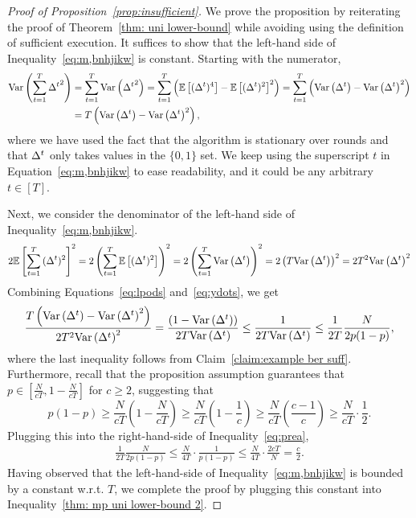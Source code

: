 \begin{proof}[Proof of Proposition~\ref{prop:insufficient}]
We prove the proposition by reiterating the proof of Theorem~\ref{thm: uni lower-bound} while avoiding using the definition of sufficient execution. It suffices to show that the left-hand side of Inequality~\eqref{eq:m,bnhjikw} is constant. Starting with the numerator,
\begin{align}\label{eq:lpods}
\mathrm{Var}\left(  \sum^T_{t=1}{ {\Delta^t}^2}  \right) &= \sum^T_{t=1} \mathrm{Var}\left(  {\Delta^t}^2 \right) =  \sum^T_{t=1} \left(\mathbb{E}\left[ ({\Delta^t})^4 \right]-\mathbb{E}\left[ ({\Delta^t})^2 \right]^2 \right) = \sum^T_{t=1} \left( \mathrm{Var}\left( {\Delta^t} \right) - \mathrm{Var}\left( {\Delta^t} \right)^2 \right) \nonumber \\
&= T\left( \mathrm{Var}\left( {\Delta^t} \right) - \mathrm{Var}\left( {\Delta^t} \right)^2 \right),
\end{align}
where we have used the fact that the algorithm is stationary over rounds and that ${\Delta^t}$ only takes values in the $\{0,1\}$ set. We keep using the superscript $t$ in Equation~\eqref{eq:m,bnhjikw} to ease readability, and it could be any arbitrary $t \in [T]$.

Next, we consider the denominator of the left-hand side of Inequality~\eqref{eq:m,bnhjikw}.
\begin{align}\label{eq:ydots}
2 \mathbb{E}\left[  \sum^T_{t=1}{({\Delta^t})^2}  \right]^2 =2  \left(\sum^T_{t=1}{\mathbb{E}\left[ ({\Delta^t})^2 \right] }\right)^2 = 2  \left(\sum^T_{t=1}{\mathrm{Var}\left( {\Delta^t} \right) }\right)^2 =  2 \left(T{\mathrm{Var}\left( {\Delta^t} \right) }\right)^2 = 2T^2 \mathrm{Var}\left( {\Delta^t} \right)^2
\end{align}
Combining Equations~\eqref{eq:lpods} and~\eqref{eq:ydots}, we get
\begin{align}\label{eq:prea}
\frac{T\left( \mathrm{Var}\left( {\Delta^t} \right) - \mathrm{Var}\left( {\Delta^t} \right)^2 \right)}{2T^2 \mathrm{Var}\left( {\Delta^t} \right)^2}=\frac{\left( 1 - \mathrm{Var}\left( {\Delta^t} \right) \right)}{2T \mathrm{Var}\left( {\Delta^t} \right)} \leq 
\frac{1}{2T \mathrm{Var}\left( {\Delta^t} \right)} \leq \frac{1}{2T}\frac{N}{2p(1-p)},
\end{align}
where the last inequality follows from Claim~\ref{claim:example ber suff}. 
Furthermore, recall that the proposition assumption guarantees that $p\in \left[\frac{N}{cT}, 1-\frac{N}{cT}\right]$ for $c\geq 2$, suggesting that
\[
p (1-p)\geq \frac{N}{cT}\left(1- \frac{N}{cT}\right) \geq \frac{N}{cT}\left(1- \frac{1}{c}\right) \geq \frac{N}{cT}\left(\frac{c-1}{c}\right) \geq \frac{N}{cT}\cdot \frac{1}{2}.
\]
Plugging this into the right-hand-side of Inequality~\eqref{eq:prea},
\begin{align}
 \frac{1}{2T}\frac{N}{2p(1-p)} \leq \frac{N}{4T} \cdot \frac{1}{p(1-p)} \leq \frac{N}{4T} \cdot \frac{2c T}{N}  = \frac{c}{2}.
\end{align}
Having observed that the left-hand-side of Inequality~\eqref{eq:m,bnhjikw} is bounded by a constant w.r.t. $T$, we complete the proof by plugging this constant into Inequality~\eqref{thm: mp uni lower-bound 2}.
\end{proof}


